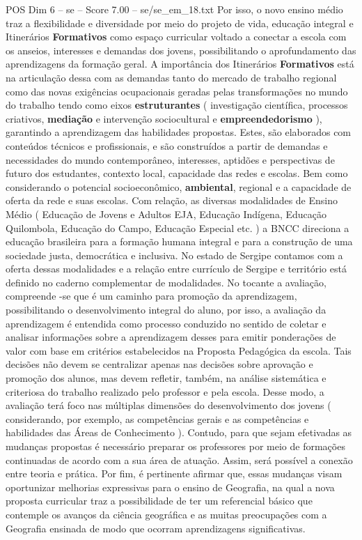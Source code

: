 \begin{textsample}{POS Dim 6 – se – Score 7.00 – se/se\_em\_18.txt}
Por isso, o novo ensino médio traz a flexibilidade e diversidade por meio do projeto de vida, educação integral e Itinerários \textbf{Formativos} como espaço curricular voltado a conectar a escola com os anseios, interesses e demandas dos jovens, possibilitando o aprofundamento das aprendizagens da formação geral.
A importância dos Itinerários \textbf{Formativos} está na articulação dessa com as demandas tanto do mercado de trabalho regional como das novas exigências ocupacionais geradas pelas transformações no mundo do trabalho tendo como eixos \textbf{estruturantes} ( investigação científica, processos criativos, \textbf{mediação} e intervenção sociocultural e \textbf{empreendedorismo} ), garantindo a aprendizagem das habilidades propostas.
Estes, são elaborados com conteúdos técnicos e profissionais, e são construídos a partir de demandas e necessidades do mundo contemporâneo, interesses, aptidões e perspectivas de futuro dos estudantes, contexto local, capacidade das redes e escolas.
Bem como considerando o potencial socioeconômico, \textbf{ambiental}, regional e a capacidade de oferta da rede e suas escolas.
Com relação, as diversas modalidades de Ensino Médio ( Educação de Jovens e Adultos EJA, Educação Indígena, Educação Quilombola, Educação do Campo, Educação Especial etc. ) a BNCC direciona a educação brasileira para a formação humana integral e para a construção de uma sociedade justa, democrática e inclusiva.
No estado de Sergipe contamos com a oferta dessas modalidades e a relação entre currículo de Sergipe e território está definido no caderno complementar de modalidades.
No tocante a avaliação, compreende -se que é um caminho para promoção da aprendizagem, possibilitando o desenvolvimento integral do aluno, por isso, a avaliação da aprendizagem é entendida como processo conduzido no sentido de coletar e analisar informações sobre a aprendizagem desses para emitir ponderações de valor com base em critérios estabelecidos na Proposta Pedagógica da escola.
Tais decisões não devem se centralizar apenas nas decisões sobre aprovação e promoção dos alunos, mas devem refletir, também, na análise sistemática e criteriosa do trabalho realizado pelo professor e pela escola.
Desse modo, a avaliação terá foco nas múltiplas dimensões do desenvolvimento dos jovens ( considerando, por exemplo, as competências gerais e as competências e habilidades das Áreas de Conhecimento ).
Contudo, para que sejam efetivadas as mudanças propostas é necessário preparar os professores por meio de formações continuadas de acordo com a sua área de atuação.
Assim, será possível a conexão entre teoria e prática.
Por fim, é pertinente afirmar que, essas mudanças visam oportunizar melhorias expressivas para o ensino de Geografia, na qual a nova proposta curricular traz a possibilidade de ter um referencial básico que contemple os avanços da ciência geográfica e as muitas preocupações com a Geografia ensinada de modo que ocorram aprendizagens significativas.

\end{textsample}
